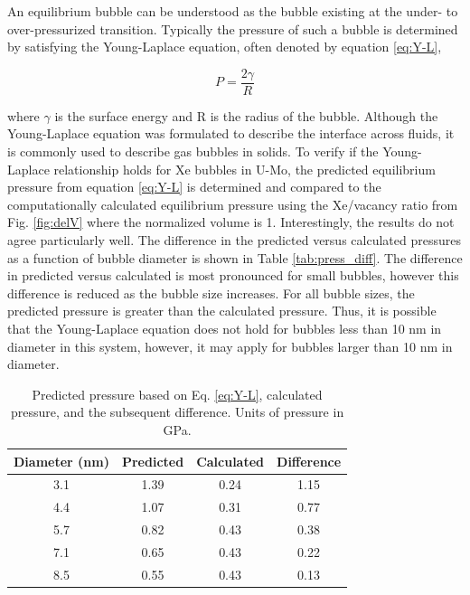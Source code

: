 \documentclass[review]{elsarticle}
\begin{document}
An equilibrium bubble can be understood as the bubble existing at the under- to over-pressurized transition. Typically the pressure of such a bubble is determined by satisfying the Young-Laplace equation, often denoted by equation \ref{eq:Y-L},

\begin{equation}
\label{eq:Y-L}
P = \frac{2\gamma}{R}
\end{equation}

where $\gamma$ is the surface energy and R is the radius of the bubble. Although the Young-Laplace equation was formulated to describe the interface across fluids, it is commonly used to describe gas bubbles in solids. To verify if the Young-Laplace relationship holds for Xe bubbles in U-Mo, the predicted equilibrium pressure from equation \ref{eq:Y-L} is determined and compared to the computationally calculated equilibrium pressure using the Xe/vacancy ratio from Fig. \ref{fig:delV} where the normalized volume is 1. Interestingly, the results do not agree particularly well. The difference in the predicted versus calculated pressures as a function of bubble diameter is shown in Table \ref{tab:press_diff}. The difference in predicted versus calculated is most pronounced for small bubbles, however this difference is reduced as the bubble size increases. For all bubble sizes, the predicted pressure is greater than the calculated pressure. Thus, it is possible that the Young-Laplace equation does not hold for bubbles less than 10 nm in diameter in this system, however, it may apply for bubbles larger than 10 nm in diameter. 

\begin{table}[h!]
\caption{Predicted pressure based on Eq. \ref{eq:Y-L}, calculated pressure, and the subsequent difference. Units of pressure in GPa. }
\label{tab:press_diff}
\begin{center}
\begin{tabular}{|c|c|c|c|}
     \hline
Diameter (nm) & Predicted & Calculated & Difference \\
\hline
3.1 & 1.39 & 0.24 & 1.15 \\
4.4 & 1.07 & 0.31 & 0.77 \\
5.7 & 0.82 & 0.43 & 0.38 \\
7.1 & 0.65 & 0.43 & 0.22 \\
8.5 & 0.55 & 0.43 & 0.13 \\
     \hline
\end{tabular}
\end{center}
\label{default}
\end{table}%
\end{document}
